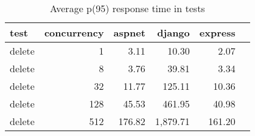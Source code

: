 \FloatBarrier
\begin{table}[!htp]\centering
    \caption{Average p(95) response time in tests}\label{tab:resultsDelete}
    \scriptsize
    \begin{tabular}{lrrrrr}\toprule
        test   & concurrency & aspnet & django   & express \\\midrule
        delete & 1           & 3.11   & 10.30    & 2.07    \\
        delete & 8           & 3.76   & 39.81    & 3.34    \\
        delete & 32          & 11.77  & 125.11   & 10.36   \\
        delete & 128         & 45.53  & 461.95   & 40.98   \\
        delete & 512         & 176.82 & 1,879.71 & 161.20  \\
        \bottomrule
    \end{tabular}
\end{table}
\FloatBarrier
